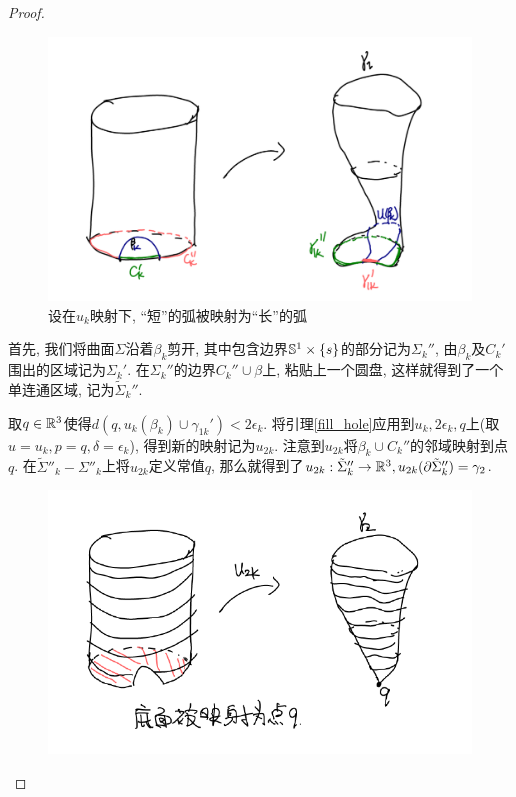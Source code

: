 \begin{proof}
\begin{claim}
\begin{subproof}
\begin{figure}[ht]
                \includegraphics[scale=0.4]{images/pinch.png}
                \caption{设在$u_k$映射下, ``短''的弧被映射为``长''的弧}
                \label{pinch}
            \end{figure}
            \par 首先, 我们将曲面$\Sigma$沿着$\beta_k$剪开, 其中包含边界$\S^1\times \{s\}$的部分记为$\Sigma_k''$, 由$\beta_k$及$C_k'$围出的区域记为$\Sigma_k'$. 在$\Sigma_k''$的边界$C_k''\cup \beta$上, 粘贴上一个圆盘, 这样就得到了一个单连通区域, 记为$\tilde{\Sigma}_k''$.  %
            \par 取$q \in \R^3$使得$d(q, u_k(\beta_k) \cup \gamma_{1k}') < 2\epsilon_k$.  将引理\eqref{fill_hole}应用到$u_k, 2\epsilon_k, q$上(取$u=u_k, p=q, \delta=\epsilon_k$), 得到新的映射记为$u_{2k}$. 注意到$u_{2k}$将$\beta_k \cup C_k''$的邻域映射到点$q$. 在$\tilde{\Sigma}''_k-\Sigma''_k$上将$u_{2k}$定义常值$q$, 那么就得到了$u_{2k}: \tilde{\Sigma}_k'' \to \R^3, u_{2k}({\P \tilde{\Sigma}_k''})=\gamma_2$.
            \begin{figure}[ht]
                \centering
                \includegraphics[scale=0.7]{images/u2k.png}

\end{figure}
\end{subproof}
\end{claim}
\end{proof}
